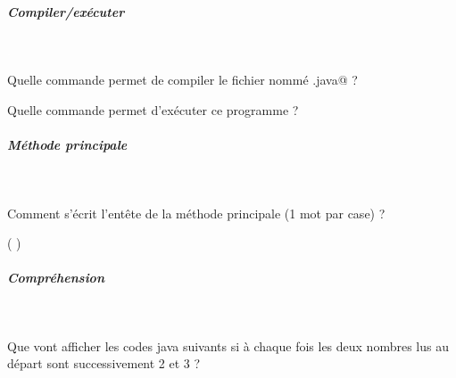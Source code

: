 \documentclass[11pt,a4paper]{article}
\begin{document}
		\subparagraph{Compiler/ex\'ecuter} 
		
                \textcolor{white}{.} \par
             
							Quelle commande permet de compiler le fichier nomm\'e \verb@SommeChiffres.java@ ?  
							\par
				 \textcolor{gray}{\underline{\hspace*{3em}}}  \textcolor{gray}{\underline{\hspace*{16em}}} \par
				
							Quelle commande permet d'ex\'ecuter ce programme ?  
							\par
				 \textcolor{gray}{\underline{\hspace*{3em}}}  \textcolor{gray}{\underline{\hspace*{10em}}} 
			
		\subparagraph{M\'ethode principale} 
		
                \textcolor{white}{.} \par
            
								Comment s'\'ecrit l'ent\^ete de la m\'ethode principale (1 mot par case) ?
							
            \par
         \textcolor{gray}{\underline{\hspace*{5em}}}  \textcolor{gray}{\underline{\hspace*{5em}}}  \textcolor{gray}{\underline{\hspace*{3em}}}  \textcolor{gray}{\underline{\hspace*{3em}}}  
							(            
							 \textcolor{gray}{\underline{\hspace*{5em}}}  \textcolor{gray}{\underline{\hspace*{2em}}}  \textcolor{gray}{\underline{\hspace*{3em}}}  
							)   
						
			
		\subparagraph{Compr\'ehension} 
		
                \textcolor{white}{.} \par
            
							  Que vont afficher les codes java suivants si \`a chaque fois les deux nombres lus au d\'epart sont successivement 2 et 3 ?
							
\end{document}
